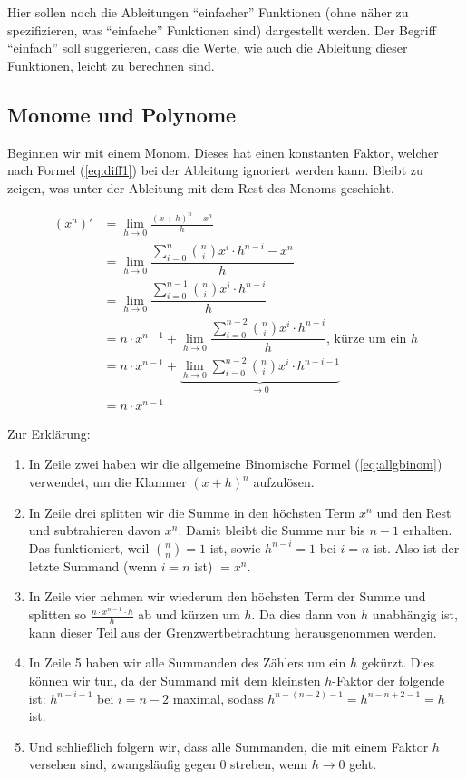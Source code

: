 Hier sollen noch die Ableitungen "`einfacher"' Funktionen (ohne näher zu spezifizieren, was "`einfache"' Funktionen sind)  dargestellt werden. Der Begriff "`einfach"' soll suggerieren, dass die Werte, wie auch die Ableitung dieser Funktionen, leicht zu berechnen sind.

\subsection{Monome und Polynome}

Beginnen wir mit einem Monom. Dieses hat einen konstanten Faktor, welcher nach Formel (\ref{eq:diff1}) bei der Ableitung ignoriert werden kann. Bleibt zu zeigen, was unter der Ableitung mit dem Rest des Monoms geschieht. 

\begin{equation}
\begin{split}
(x^n)' &= \lim_{h\rightarrow 0} \frac{(x+h)^n - x^n}{h} \\
&= \lim_{h\rightarrow 0} \dfrac{\sum_{i=0}^{n}\binom{n}{i} x^i \cdot h^{n-i} - x^n}{h}\\
&= \lim_{h\rightarrow 0} \dfrac{\sum_{i=0}^{n-1}\binom{n}{i} x^i \cdot h^{n-i}}{h}\\
&= n\cdot x^{n-1} + \lim_{h\rightarrow 0} \dfrac{\sum_{i=0}^{n-2}\binom{n}{i} x^i \cdot h^{n-i}}{h} \text{, kürze um ein $h$} \\
&= n\cdot x^{n-1} + \underbrace{\lim_{h\rightarrow 0} \sum_{i=0}^{n-2}\binom{n}{i} x^i \cdot h^{n-i-1}}_{\rightarrow 0}\\
&= n\cdot x^{n-1}
\end{split}
\end{equation}

\noindent Zur Erklärung:

\begin{enumerate}
\item In Zeile zwei haben wir die allgemeine Binomische Formel (\ref{eq:allgbinom}) verwendet, um die Klammer $(x+h)^n$ aufzulösen.
\item In Zeile drei splitten wir die Summe in den höchsten Term $x^n$ und den Rest und subtrahieren davon $x^n$. Damit bleibt die Summe nur bis $n-1$ erhalten. Das funktioniert, weil $\binom{n}{n}=1$ ist, sowie $h^{n-i}=1$ bei $i=n$ ist. Also ist der letzte Summand (wenn $i=n$ ist) $=x^n$.
\item In Zeile vier nehmen wir wiederum den höchsten Term der Summe und splitten so $\frac{n\cdot x^{n-1}\cdot h}{h}$ ab und kürzen um $h$. Da dies dann von $h$ unabhängig ist, kann dieser Teil aus der Grenzwertbetrachtung herausgenommen werden.
\item In Zeile 5 haben wir alle Summanden des Zählers um ein $h$ gekürzt. Dies können wir tun, da der Summand mit dem kleinsten $h$-Faktor der folgende ist: $h^{n-i-1}$ bei $i=n-2$ maximal, sodass $h^{n-(n-2)-1}=h^{n-n+2-1}=h$ ist.
\item Und schließlich folgern wir, dass alle Summanden, die mit einem Faktor $h$ versehen sind, zwangsläufig gegen 0 streben, wenn $h\rightarrow 0$ geht. 
\end{enumerate}

